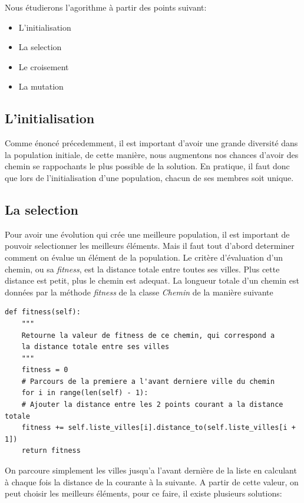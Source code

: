\documentclass[11pt]{article}
\begin{document}
Nous étudierons l'agorithme à partir des points suivant:
\begin{itemize}
\item L'initialisation
\item La selection
\item Le croisement
\item La mutation
\end{itemize}

\subsection{L'initialisation}
\label{sec-2-4}
Comme énoncé précedemment, il est important d'avoir une grande diversité dans la population
initiale, de cette manière, nous augmentons nos chances d'avoir des chemin se rappochants
le plus possible de la solution. En pratique, il faut donc que lors de l'initialisation d'une
population, chacun de ses membres soit unique.

\subsection{La selection}
\label{sec-2-5}
Pour avoir une évolution qui crée une meilleure population, il est important de pouvoir selectionner
les meilleurs éléments. Mais il faut tout d'abord determiner comment on évalue un élément de la
population.
Le critère d'évaluation d'un chemin, ou sa \emph{fitness}, est la distance totale entre toutes
ses villes. Plus cette distance est petit, plus le chemin est adequat. La longueur totale
d'un chemin est données par la méthode \emph{fitness} de la classe \emph{Chemin} de la manière suivante
\begin{verbatim}
def fitness(self):
    """
    Retourne la valeur de fitness de ce chemin, qui correspond a
    la distance totale entre ses villes
    """
    fitness = 0
    # Parcours de la premiere a l'avant derniere ville du chemin
    for i in range(len(self) - 1):
	# Ajouter la distance entre les 2 points courant a la distance totale
	fitness += self.liste_villes[i].distance_to(self.liste_villes[i + 1])
    return fitness
\end{verbatim}
On parcoure simplement les villes jusqu'a l'avant dernière de la liste en calculant à chaque
fois la distance de la courante à la suivante.
A partir de cette valeur, on peut choisir les meilleurs éléments, pour ce faire, il existe plusieurs solutions:
\end{document}
